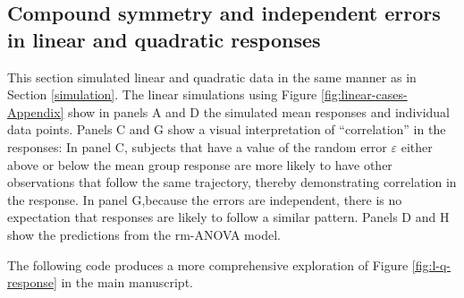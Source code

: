 \documentclass[
]{article}
\begin{document}
\hypertarget{compound-symmetry-and-independent-errors-in-linear-and-quadratic-responses}{%
\subsection{Compound symmetry and independent errors in linear and quadratic responses}\label{compound-symmetry-and-independent-errors-in-linear-and-quadratic-responses}}

This section simulated linear and quadratic data in the same manner as in Section \ref{simulation}. The linear simulations using Figure \ref{fig:linear-cases-Appendix} show in panels A and D the simulated mean responses and individual data points. Panels C and G show a visual interpretation of ``correlation'' in the responses: In panel C, subjects that have a value of the random error \(\varepsilon\) either above or below the mean group response are more likely to have other observations that follow the same trajectory, thereby demonstrating correlation in the response. In panel G,because the errors are independent, there is no expectation that responses are likely to follow a similar pattern. Panels D and H show the predictions from the rm-ANOVA model.

The following code produces a more comprehensive exploration of Figure \ref{fig:l-q-response} in the main manuscript.
\end{document}
